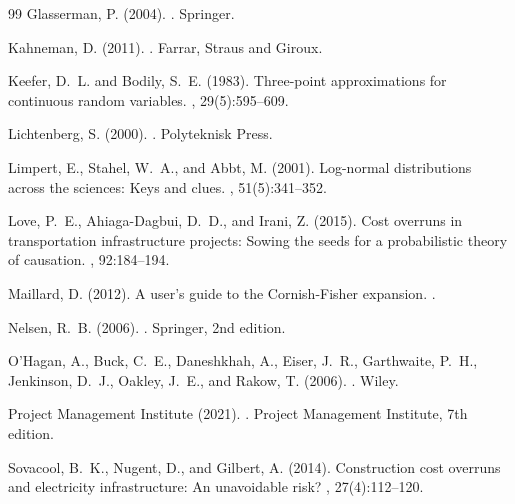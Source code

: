 \documentclass[12pt,a4paper]{article}
\theoremstyle{definition}
\theoremstyle{remark}
\begin{document}
\begin{thebibliography}{99}
Glasserman, P. (2004).
.
\newblock Springer.

Kahneman, D. (2011).
.
\newblock Farrar, Straus and Giroux.

Keefer, D.~L. and Bodily, S.~E. (1983).
\newblock Three-point approximations for continuous random variables.
, 29(5):595--609.

Lichtenberg, S. (2000).
.
\newblock Polyteknisk Press.

Limpert, E., Stahel, W.~A., and Abbt, M. (2001).
\newblock Log-normal distributions across the sciences: Keys and clues.
, 51(5):341--352.

Love, P.~E., Ahiaga-Dagbui, D.~D., and Irani, Z. (2015).
\newblock Cost overruns in transportation infrastructure projects: Sowing the seeds for a probabilistic theory of causation.
, 92:184--194.

Maillard, D. (2012).
\newblock A user's guide to the {Cornish-Fisher} expansion.
.

Nelsen, R.~B. (2006).
.
\newblock Springer, 2nd edition.

O'Hagan, A., Buck, C.~E., Daneshkhah, A., Eiser, J.~R., Garthwaite, P.~H., Jenkinson, D.~J., Oakley, J.~E., and Rakow, T. (2006).
.
\newblock Wiley.

Project Management Institute (2021).
.
\newblock Project Management Institute, 7th edition.

Sovacool, B.~K., Nugent, D., and Gilbert, A. (2014).
\newblock Construction cost overruns and electricity infrastructure: An unavoidable risk?
, 27(4):112--120.


\end{thebibliography}
\end{document}
